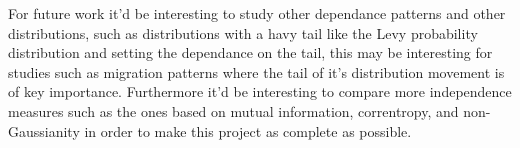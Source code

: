 For future work it'd be interesting to study other dependance patterns and other distributions, such as distributions with a havy tail like the Levy probability distribution and setting the dependance on the tail, this may be interesting for studies such as migration patterns where the tail of it's distribution movement is of key importance. 
Furthermore it'd be interesting to compare more independence measures such as the ones based on mutual information, correntropy, and non-Gaussianity in order to make this project as complete as possible.



